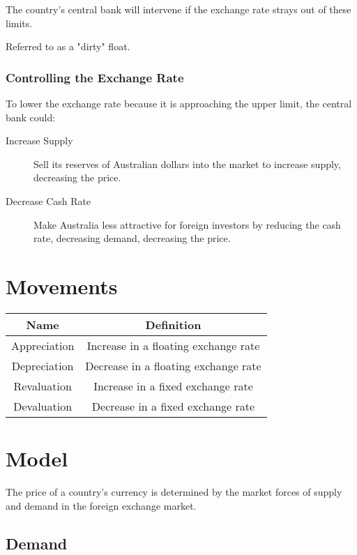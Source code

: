 \documentclass[a4paper,11pt]{report}
\begin{document}
The country's central bank will intervene if the exchange rate strays out of
these limits.

Referred to as a "dirty" float.

\subsubsection{Controlling the Exchange Rate}

To lower the exchange rate because it is approaching the upper limit, the
central bank could:

\begin{description}
\item [Increase Supply] Sell its reserves of Australian dollars into the market
	to increase supply, decreasing the price.
\item [Decrease Cash Rate] Make Australia less attractive for foreign
	investors by reducing the cash rate, decreasing demand, decreasing the
	price.
\end{description}


\section{Movements}

\begin{center}
\begin{tabular}{c|c}
Name & Definition \\
\hline
Appreciation & Increase in a floating exchange rate \\
Depreciation & Decrease in a floating exchange rate \\
Revaluation & Increase in a fixed exchange rate \\
Devaluation & Decrease in a fixed exchange rate \\
\end{tabular}
\end{center}


\section{Model}

The price of a country's currency is determined by the market forces of supply
and demand in the foreign exchange market.

\subsection{Demand}
\end{document}
